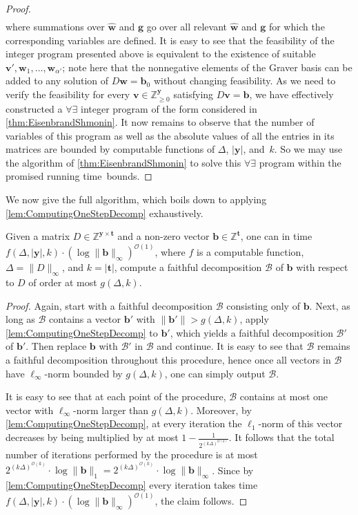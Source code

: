 \documentclass{theoretics}
\renewcommand{\geq}{\geqslant}
\newcommand{\Bb}{\mathcal{B}}
\newcommand{\Z}{\mathbb{Z}}
\newcommand{\Zn}{\Z_{\geq 0}}
\newcommand{\tup}[1]{{\mathbf{#1}}}
\newcommand{\ww}{\tup w}
\newcommand{\whww}{{\widehat{\ww}}}
\newcommand{\yy}{\tup y}
\newcommand{\tv}{\tup t}
\newcommand{\bb}{\tup b}
\renewcommand{\gg}{\tup g}
\newcommand{\myvv}{\tup v} %
\newcommand{\matrices}[3]{#1^{#2\times #3}}
\newcommand{\Oh}{{\mathcal{O}}}
\begin{document}
\begin{proof}
\begin{align*}
\end{align*}
where summations over $\whww$ and $\gg$ go over all relevant $\whww$ and $\gg$ for which the corresponding variables are defined. It is easy to see that the feasibility of the integer program presented above is equivalent to the existence of suitable $\myvv',\ww_1,\ldots,\ww_{\alpha'}$; note here that the nonnegative elements of the Graver basis can be added to any solution of $D\ww=\bb_0$ without changing feasibility. As we need to verify the feasibility for every $\myvv\in \Zn^\yy$ satisfying $D\myvv=\bb$, we have effectively constructed a $\forall\exists$ integer program of the form considered in \cref{thm:EisenbrandShmonin}. It now remains to observe that the number of variables of this program as well as the absolute values of all the entries in its matrices are bounded by computable functions of $\Delta$, $|\yy|$, and~$k$. So we may use the algorithm of \cref{thm:EisenbrandShmonin} to solve this $\forall\exists$ program within the promised running time~bounds.
\end{proof}

We now give the full algorithm, which boils down to applying \cref{lem:ComputingOneStepDecomp} exhaustively.

\begin{lemma}\label{lem:ComputingCompleteDecomp}
Given a matrix $D\in \matrices{\Z}{\yy}{\tv}$ and a non-zero vector $\bb\in \Z^{\tv}$, one can in time $f(\Delta,|\yy|,k)\cdot (\log \|\bb\|_\infty)^{\Oh(1)}$, where $f$ is a computable function, $\Delta=\|D\|_\infty$, and $k=|\tv|$, compute a faithful decomposition $\Bb$ of $\bb$ with respect to $D$ of order at most $g(\Delta,k)$.
\end{lemma}
\begin{proof}
Again, start with a faithful decomposition $\Bb$ consisting only of $\bb$. Next, as long as $\Bb$ contains a vector $\bb'$ with $\|\bb'\|>g(\Delta,k)$, apply \cref{lem:ComputingOneStepDecomp} to $\bb'$, which yields a faithful decomposition $\Bb'$ of $\bb'$. Then replace $\bb$ with $\Bb'$ in $\Bb$ and continue. It is easy to see that $\Bb$ remains a faithful decomposition throughout this procedure, hence once all vectors in $\Bb$ have $\ell_\infty$-norm bounded by $g(\Delta,k)$, one can simply output $\Bb$.

It is easy to see that at each point of the procedure, $\Bb$ contains at most one vector with $\ell_\infty$-norm larger than $g(\Delta,k)$. Moreover, by \cref{lem:ComputingOneStepDecomp}, at every iteration the $\ell_1$-norm of this vector decreases by being multiplied by at most $1-\frac{1}{2^{(k\Delta)^{\Oh(k)}}}$. It follows that the total number of iterations performed by the procedure is at most $2^{(k\Delta)^{\Oh(k)}}\cdot \log \|\bb\|_1=2^{(k\Delta)^{\Oh(k)}}\cdot \log \|\bb\|_\infty$. Since by \cref{lem:ComputingOneStepDecomp} every iteration takes time $f(\Delta,|\yy|,k)\cdot (\log \|\bb\|_\infty)^{\Oh(1)}$, the claim follows.
\end{proof}
\end{document}
